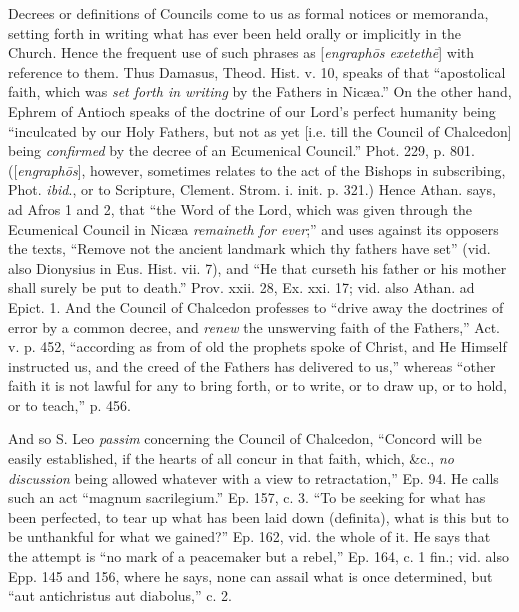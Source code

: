 Decrees or definitions of Councils come to us as
formal notices or memoranda, setting forth in writing what has ever
been held orally or implicitly in the Church. Hence the frequent use
of such phrases as [\emph{engraph\={o}s exeteth\={e}}] with
reference to them. Thus Damasus, Theod. Hist. v. 10, speaks of that ``apostolical
faith, which was \emph{set forth in writing}
by the Fathers in Nicæa.'' On the other hand, Ephrem of Antioch
speaks of the doctrine of our Lord's perfect humanity being ``inculcated
by our Holy Fathers, but not as yet [i.e. till the Council of
Chalcedon] being \emph{confirmed} by the decree of an Ecumenical Council.'' Phot. 229, p. 801. ([\emph{engraph\={o}s}],
however, sometimes relates to the act of the Bishops in subscribing,
Phot. \emph{ibid}., or
to Scripture, Clement. Strom. i. init. p. 321.) Hence Athan. says, ad
Afros 1 and 2, that ``the Word of the Lord, which was given through the
Ecumenical Council in Nicæa \emph{remaineth for ever};''
and uses against its opposers the texts, ``Remove not the
ancient landmark which thy fathers have set'' (vid. also Dionysius in
Eus. Hist. vii. 7), and ``He that curseth his father or his mother
shall surely be put to death.'' Prov. xxii. 28, Ex. xxi. 17; vid. also
Athan. ad Epict. 1. And the Council of Chalcedon professes to ``drive
away the doctrines of error by a common decree, and \emph{renew}
the unswerving faith of the Fathers,'' Act. v. p. 452, ``according
as from of old the prophets spoke of Christ, and He Himself instructed
us, and the creed of the Fathers has delivered to us,'' whereas ``other
faith it is not lawful for any to bring forth, or to write, or to draw
up, or to hold, or to teach,'' p. 456.

And so S. Leo \emph{passim} concerning the Council of Chalcedon, ``Concord will be easily
established, if the hearts of all concur in that faith, which,
\&c., \emph{no discussion}
being allowed whatever with a view to retractation,'' Ep. 94. He
calls such an act ``magnum sacrilegium.'' Ep. 157, c. 3. ``To be seeking
for what has been perfected, to tear up what has been laid down (definita),
what is this but to be unthankful for what we gained?'' Ep. 162, vid.
the whole of it. He says that the attempt is ``no mark of a peacemaker
but a rebel,'' Ep. 164, c. 1 fin.; vid. also Epp. 145 and 156, where he
says, none can assail what is once determined, but ``aut antichristus
aut diabolus,'' c. 2.


